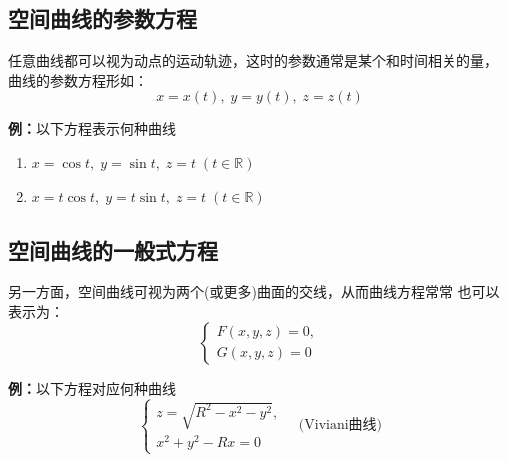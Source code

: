 \subsection{空间曲线的参数方程}

任意曲线都可以视为动点的运动轨迹，这时的参数通常是某个和时间相关的量，
曲线的参数方程形如：
$$x=x(t),\;y=y(t),\;z=z(t)$$

{\bf 例：}以下方程表示何种曲线
\begin{enumerate}[(1)]
  \setlength{\itemindent}{1cm}
  \item $x=\cos t,\;y=\sin t,\;z=t\;(t\in\mathbb{R})$ 
  \item $x=t\cos t,\;y=t\sin t,\;z=t\;(t\in\mathbb{R})$ 
\end{enumerate}

\subsection{空间曲线的一般式方程}

另一方面，空间曲线可视为两个(或更多)曲面的交线，从而曲线方程常常
也可以表示为：
$${\left\{\begin{array}{l}
	F(x,y,z)=0,\\ G(x,y,z)=0
\end{array}\right.}$$

{\bf 例：}以下方程对应何种曲线
$$\left\{\begin{array}{l}
	z=\sqrt{R^2-x^2-y^2},\\ x^2+y^2-Rx=0
\end{array}\right. \quad{\mbox{(Viviani曲线)}}$$
\begin{center}
\end{center}

